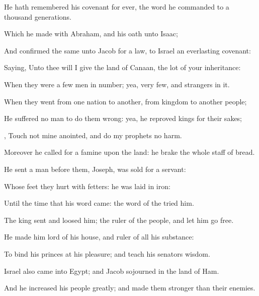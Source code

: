 {\Q {}He hath
remembered his
covenant for
ever, the
word
{} he
commanded to a
thousand
generations.


\par }{\Q {}Which
{} he
made with
Abraham, and his
oath unto
Isaac;


\par }{\Q {}And
confirmed the same unto
Jacob for a
law,
{} to
Israel
{} an
everlasting
covenant:


\par }{\Q {}Saying, Unto thee will I
give the
land of
Canaan, the
lot of your
inheritance:


\par }{\Q {}When they were
{} a few
men in
number; yea, very
few, and
strangers in it.


\par }{\Q {}When they
went from one
nation to another, from
{}
kingdom to
another
people;


\par }{\Q {}He
suffered no
man to do them
wrong: yea, he
reproved
kings for their sakes;


\par }{\Q {},
Touch not mine
anointed, and do my
prophets no
harm.


\par }{\Q {}Moreover he
called for a
famine upon the
land: he
brake the whole
staff of
bread.


\par }{\Q {}He
sent a
man
before them,
{}
Joseph,
{} was
sold for a
servant:


\par }{\Q {}Whose
feet they
hurt with
fetters:
he was
laid in
iron:


\par }{\Q {}Until the
time that his
word
came: the
word of the
{}
tried him.


\par }{\Q {}The
king
sent and
loosed him;
{} the
ruler of the
people, and let him go
free.


\par }{\Q {}He
made him
lord of his
house, and
ruler of all his
substance:


\par }{\Q {}To
bind his
princes at his
pleasure; and teach his
senators
wisdom.


\par }{\Q {}Israel also
came into
Egypt; and
Jacob
sojourned in the
land of
Ham.


\par }{\Q {}And he
increased his
people
greatly; and made them
stronger than their
enemies.


\par }{\BB \par }
